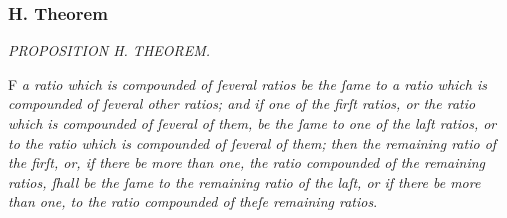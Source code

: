 \documentclass[12pt,preview]{standalone}
\begin{document}
\subsubsection{H. Theorem}

\newcommand{\redA}{{\color{cred}{A}}}
\newcommand{\redB}{{\color{cred}{B}}}
\newcommand{\redC}{{\color{cred}{C}}}
\newcommand{\redD}{{\color{cred}{D}}}
\newcommand{\redE}{{\color{cred}{E}}}
\newcommand{\redF}{{\color{cred}{F}}}
\newcommand{\redG}{{\color{cred}{G}}}
\newcommand{\redH}{{\color{cred}{H}}}

\newcommand{\blueP}{{\color{cblue}{P}}}
\newcommand{\blueQ}{{\color{cblue}{Q}}}
\newcommand{\blueR}{{\color{cblue}{R}}}
\newcommand{\blueS}{{\color{cblue}{S}}}
\newcommand{\blueT}{{\color{cblue}{T}}}
\newcommand{\blueX}{{\color{cblue}{X}}}

\begin{minipage}{\textwidth}

    \begin{center}
        \textit{PROPOSITION H. THEOREM.}\label{book5prH} \\
    \end{center}

    \hfill

    \begin{center}
        \raggedright \lettrine[lines=4, loversize=1, nindent=0pt]{}{}F \textit{a ratio which is compounded of ſeveral ratios be the ſame to a ratio which is compounded of ſeveral other ratios; and if one of the firſt ratios, or the ratio which is compounded of ſeveral of them, be the ſame to one of the laſt ratios, or to the ratio which is compounded of ſeveral of them; then the remaining ratio of the firſt, or, if there be more than one, the ratio compounded of the remaining ratios, ſhall be the ſame to the remaining ratio of the laſt, or if there be more than one, to the ratio compounded of theſe remaining ratios}.
    \end{center}

    \hfill

    \hfill

    \begin{center}
        \minibox[frame,c]{\redA\ \ \redB\ \ \redC\ \ \redD\ \ \redE\ \ \redF\ \ \redG\ \ \redH \\ \blueP\ \ \blueQ\ \ \blueR\ \ \blueS\ \ \blueT\ \ \blueX}
    \end{center}

    \hfill

    \hfill


\end{minipage}
\end{document}
